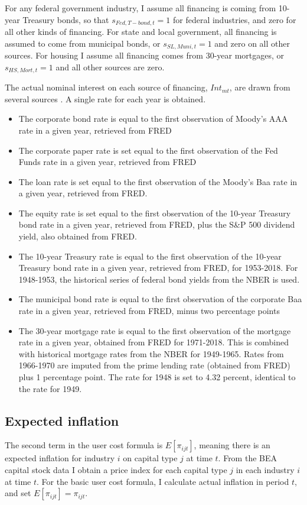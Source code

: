 \documentclass[11pt]{article}
\begin{document}
For any federal government industry, I assume all financing is coming from 10-year Treasury bonds, so that $s_{Fed,T-bond,t} = 1$ for federal industries, and zero for all other kinds of financing. For state and local government, all financing is assumed to come from municipal bonds, or $s_{SL,Muni,t} = 1$ and zero on all other sources. For housing I assume all financing comes from 30-year mortgages, or $s_{HS,Mort,t}=1$ and all other sources are zero. 

The actual nominal interest on each source of financing, $Int_{mt}$, are drawn from several sources \citep{fedint,fredmort,moodys,nberhistory}. A single rate for each year is obtained.

\begin{itemize}
	\item The corporate bond rate is equal to the first observation of Moody's AAA rate in a given year, retrieved from FRED
	\item The corporate paper rate is set equal to the first observation of the Fed Funds rate in a given year, retrieved from FRED
	\item The loan rate is set equal to the first observation of the Moody's Baa rate in a given year, retrieved from FRED.
	\item The equity rate is set equal to the first observation of the 10-year Treasury bond rate in a given year, retrieved from FRED, plus the S\&P 500 dividend yield, also obtained from FRED.
	\item The 10-year Treasury rate is equal to the first observation of the 10-year Treasury bond rate in a given year, retrieved from FRED, for 1953-2018. For 1948-1953, the historical series of federal bond yields from the NBER is used. 
	\item The municipal bond rate is equal to the first observation of the corporate Baa rate in a given year, retrieved from FRED, minus two percentage points
	\item The 30-year mortgage rate is equal to the first observation of the mortgage rate in a given year, obtained from FRED for 1971-2018. This is combined with historical mortgage rates from the NBER for 1949-1965. Rates from 1966-1970 are imputed from the prime lending rate (obtained from FRED) plus 1 percentage point. The rate for 1948 is set to 4.32 percent, identical to the rate for 1949.
\end{itemize}

\subsection{Expected inflation}
The second term in the user cost formula is $E[\pi_{ijt}]$, meaning there is an expected inflation for industry $i$ on capital type $j$ at time $t$. From the BEA capital stock data \citep{beacap} I obtain a price index for each capital type $j$ in each industry $i$ at time $t$. For the basic user cost formula, I calculate actual inflation in period $t$, and set $E[\pi_{ijt}] = \pi_{ijt}$.
\end{document}
